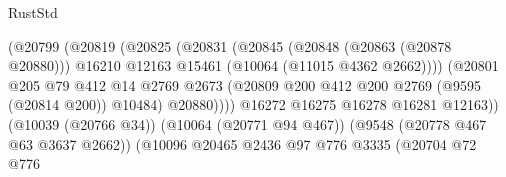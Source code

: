 \begin{lexlean}{RustStd}
\begin{coremodule}
                                                (@20799
                                                  (@20819
                                                    (@20825
                                                      (@20831
                                                        (@20845
                                                          (@20848 (@20863 (@20878 @20880)))
                                                          @16210
                                                          @12163
                                                          @15461
                                                          (@10064 (@11015 @4362 @2662))))
                                                      (@20801
                                                        @205
                                                        @79
                                                        @412
                                                        @14
                                                        @2769
                                                        @2673
                                                        (@20809
                                                          @200
                                                          @412
                                                          @200
                                                          @2769
                                                          (@9595 (@20814 @200))
                                                          @10484)
                                                        @20880))))
                                                @16272
                                                @16275
                                                @16278
                                                @16281
                                                @12163))
                                            (@10039 (@20766 @34))
                                            (@10064 (@20771 @94 @467))
                                            (@9548 (@20778 @467 @63 @3637 @2662))
                                            (@10096
                                              @20465
                                              @2436
                                              @97
                                              @776
                                              @3335
                                              (@20704
                                                @72
                                                @776

\end{coremodule}
\end{lexlean}
